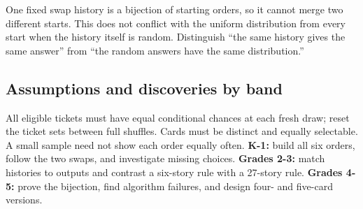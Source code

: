 One fixed swap history is a bijection of starting orders, so it cannot merge two different starts. This does not conflict with the uniform distribution from every start when the history itself is random. Distinguish ``the same history gives the same answer'' from ``the random answers have the same distribution.''

\subsection*{Assumptions and discoveries by band}
All eligible tickets must have equal conditional chances at each fresh draw; reset the ticket sets between full shuffles. Cards must be distinct and equally selectable. A small sample need not show each order equally often. \textbf{K-1:} build all six orders, follow the two swaps, and investigate missing choices. \textbf{Grades 2-3:} match histories to outputs and contrast a six-story rule with a 27-story rule. \textbf{Grades 4-5:} prove the bijection, find algorithm failures, and design four- and five-card versions.
